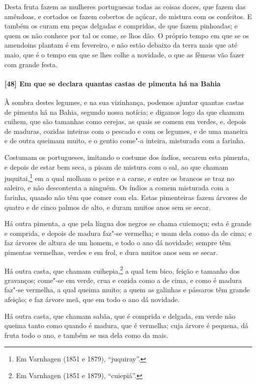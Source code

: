 \begin{linenumbers}
Desta fruta fazem as mulheres portuguesas todas as coisas doces, que fazem das amêndoas, e
cortados os fazem cobertos de açúcar, de mistura com os confeitos. E também os curam em
peças delgadas e compridas, de que fazem pinhoadas; e quem os não conhece por tal os come,
se lhos dão. O próprio tempo em que se os amendoins plantam é em fevereiro, e não estão
debaixo da terra mais que até maio, que é o tempo em que se lhes colhe a novidade, o que
as fêmeas vão fazer com grande festa.

\paragraph{[48] Em que se declara quantas castas de pimenta há na Bahia}\quad
À sombra destes legumes, e na sua vizinhança, podemos ajuntar quantas castas de pimenta há
na Bahia, segundo nossa notícia; e digamos logo da que chamam cuihem, que são tamanhas
como cerejas, as quais se comem em verdes, e, depois de maduras, cozidas inteiras com o
pescado e com os legumes, e de uma maneira e de outra queimam muito, e o gentio come"-a
inteira, misturada com a farinha.

Costumam os portugueses, imitando o costume dos índios, secarem esta pimenta, e depois de
estar bem seca, a pisam de mistura com o sal, ao que chamam juquitai,\footnote{ Em
Varnhagen (1851 e 1879), ``juquiray''.} em a qual molham o peixe e a carne, e entre os
brancos se traz no saleiro, e não descontenta a ninguém. Os índios a comem misturada com a
farinha, quando não têm que comer com ela. Estas pimenteiras fazem árvores de quatro e de
cinco palmos de alto, e duram muitos anos sem se secar.

Há outra pimenta, a que pela língua dos negros se chama cuiemoçu; esta é grande e
comprida, e depois de madura faz"-se vermelha; e usam dela como da de cima; e faz árvores
de altura de um homem, e todo o ano dá novidade; sempre têm pimentas vermelhas, verdes e
em frol, e dura muitos anos sem se secar.

Há outra casta, que chamam cuihepia,\footnote{ Em Varnhagen (1851 e 1879), ``cuiepiá''.} a
qual tem bico, feição e tamanho dos gravanços; come"-se em verde, crua e cozida como a de
cima, e como é madura faz"-se vermelha, a qual queima muito; a quem as galinhas e pássaros
têm grande afeição; e faz árvore meã, que em todo o ano dá novidade.

Há outra casta, que chamam sabãa, que é comprida e delgada, em verde não queima tanto como
quando é madura, que é vermelha; cuja árvore é pequena, dá fruta todo o ano, e também se
usa dela como da mais.


\end{linenumbers}
